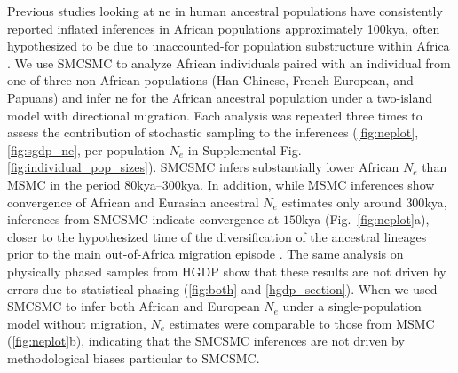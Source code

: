 Previous studies looking at \gls{ne} in human ancestral populations have consistently reported inflated inferences in African populations approximately 100kya, often hypothesized to be due to unaccounted-for population substructure within Africa \cite{Li2011,Schiffels2014}. We use SMCSMC to analyze African individuals paired with an individual from one of three non-African populations (Han Chinese, French European, and Papuans) and infer \gls{ne} for the African ancestral population under a two-island model with directional migration.  Each analysis was repeated three times to assess the contribution of stochastic sampling to the inferences (\autoref{fig:neplot}, \autoref{fig:sgdp_ne}, per population $N_e$ in Supplemental Fig. \autoref{fig:individual_pop_sizes}). SMCSMC infers substantially lower African $N_e$ than MSMC in the period $80$kya--$300$kya.  In addition, while MSMC inferences show convergence of African and Eurasian ancestral $N_e$ estimates only around $300$kya, inferences from SMCSMC indicate convergence at $150$kya (Fig.\ \autoref{fig:neplot}a), closer to the hypothesized time of the diversification of the ancestral lineages prior to the main out-of-Africa migration episode \cite{Timmermann2016, Malaspinas2016}. The same analysis on physically phased samples from HGDP show that these results are not driven by errors due to statistical phasing (\autoref{fig:both} and \autoref{hgdp_section}). When we used SMCSMC to infer both African and European $N_e$ under a single-population model without migration, $N_e$ estimates were comparable to those from MSMC (\autoref{fig:neplot}b), indicating that the SMCSMC inferences are not driven by methodological biases particular to SMCSMC.

